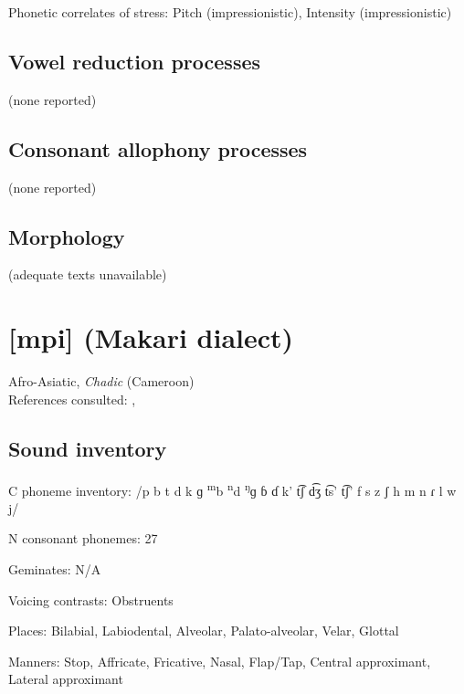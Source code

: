 {\begin{appendixdesc}
\item[Phonetic correlates of stress:] Pitch (impressionistic), Intensity (impressionistic)
\end{appendixdesc}
\subsection*{Vowel reduction processes}

(none reported)
\subsection*{Consonant allophony processes}


(none reported)

\subsection*{Morphology}

(adequate texts unavailable)

\section*{[mpi]  (Makari dialect)}   %
Afro-Asiatic, \textit{Chadic} (Cameroon)\medskip\\
References consulted: \citet{Allison2012}, \citet{Mahamat2005}

\subsection*{Sound inventory}
\begin{appendixdesc}

\item[C phoneme inventory:] /p b t d k ɡ \textsuperscript{m}b \textsuperscript{n}d \textsuperscript{ŋ}ɡ ɓ ɗ k’ t͡ʃ d͡ʒ t͡s’ t͡ʃ’ f s z ʃ h m n ɾ l w j/

\item[N consonant phonemes:] 27

\item[Geminates:] N/A

\item[Voicing contrasts:] Obstruents

\item[Places:] Bilabial, Labiodental, Alveolar, Palato-alveolar, Velar, Glottal

\item[Manners:] Stop, Affricate, Fricative, Nasal, Flap/Tap, Central approximant, Lateral approximant


\end{appendixdesc}}
